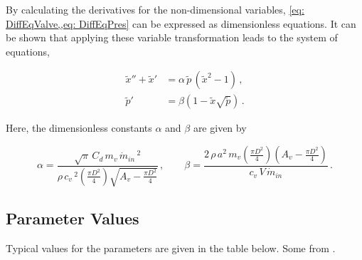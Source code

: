 By calculating the derivatives for the non-dimensional variables, \cref{eq: DiffEqValve,,eq: DiffEqPres} can be expressed as dimensionless equations. It can be shown that applying these variable transformation leads to the system of equations,

\begin{equation} \label{eq: Non-DimODE}
\begin{split}
    \tilde{x}'' + \tilde{x}' &= \alpha \, \tilde{p} \, \left( \tilde{x}^2 - 1 \right) \, ,\\
    \tilde{p}' &= \beta \left( 1 - \tilde{x} \sqrt{\tilde{p}} \right) \, .
\end{split}
\end{equation}

Here, the dimensionless constants $\alpha$ and $\beta$ are given by

\begin{equation*}
    \alpha = %
    \frac{\sqrt{\pi} \, C_d \, m_v \, \dot{m}_{in}\,^2}{\rho \, c_v\,^2 \left( \frac{\pi D^2}{4} \right) \sqrt{A_v - \frac{\pi D^2}{4}} } \, , %
    \qquad
    \beta = %
    \frac{ 2 \, \rho \, a^2 \, m_v \left( \frac{\pi D^2}{4} \right) \left( A_v - \frac{\pi D^2}{4} \right) }{ c_v \, V \, \dot{m}_{in} } \, .
\end{equation*}

\subsection{Parameter Values}

Typical values for the parameters are given in the table below. Some from \cite{Hos2016DynamicService}.


